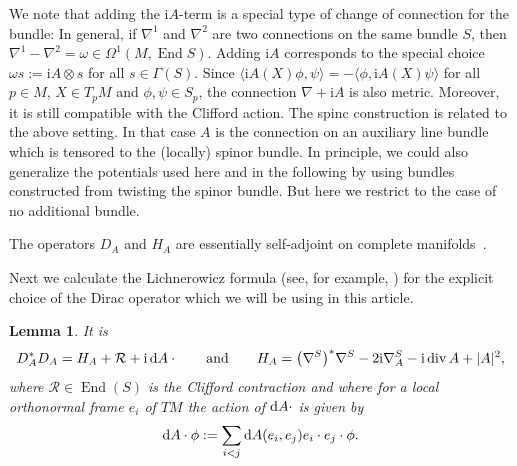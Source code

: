 \documentclass[pdftex]{sigma}
\numberwithin{equation}{section}
\newtheorem{Lemma}[Theorem]{Lemma}
\begin{document}
\begin{Remark}\label{rem_diff_conn} We note that adding the ${\mathrm{i}}A$-term is a special type of change of connection for the bundle: In general, if $\nabla^1$ and $\nabla^2$ are two connections on the same bundle $S$, then $\nabla^1-\nabla^2=\omega\in \Omega^1 (M, \operatorname{End} S)$. Adding ${\mathrm{i}}A$ corresponds to the special choice $\omega s:= {\mathrm{i}} A\otimes s$ for all $s\in \Gamma(S)$. Since $\langle {\mathrm{i}}A(X)\phi,\psi\rangle=-\langle\phi, {\mathrm{i}}A(X) \psi\rangle$ for all $p\in M$, $X\in T_p M$ and $\phi, \psi\in S_p$, the connection $\nabla +{\mathrm{i}}A$ is also metric. Moreover, it is still compatible with the Clifford action.
The spinc construction is related to the above setting. In that case $A$ is the connection on an auxiliary line bundle which is tensored to the (locally) spinor bundle. In principle, we could also generalize the potentials used here and in the following by using bundles constructed from twisting the spinor bundle. But here we restrict to the case of no additional bundle.\end{Remark}

The operators $D_A$ and $H_A$ are essentially self-adjoint on complete manifolds~\cite[pp.~411--412]{Chernoff}.

Next we calculate the Lichnerowicz formula (see, for example, \cite{LM,Roe}) for the explicit choice of the Dirac operator which we will be using in this article.

\begin{Lemma}\label{lem_DAsquare} It is
\[ D_A^*D_A = H_A + \mathcal{R} + {\mathrm{i}} \, {\rm d}A\cdot\qquad \text{and}\qquad H_{A} = \bigl(\nabla^S\bigr)^*\nabla^S -2{\mathrm{i}}  \nabla_A^S -{\mathrm{i}}  \operatorname{div} A +|A|^2, \]
where $\mathcal{R}\in \operatorname{End}(S)$ is the Clifford contraction and where for a local orthonormal frame $e_i$ of $TM$ the action of ${\rm d}A\cdot$ is given by \[{\rm d}A\cdot \phi := \sum_{i<j} {\rm d}A(e_i,e_j)e_i\cdot e_j\cdot \phi.\]
\end{Lemma}
\end{document}
